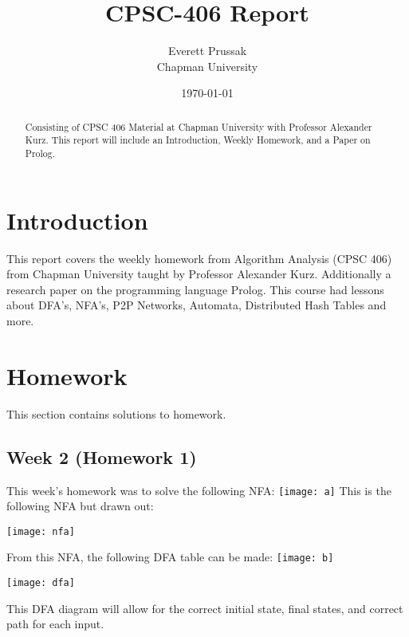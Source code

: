 \documentclass{article}
\title{CPSC-406 Report}
\author{Everett Prussak  \\ Chapman University}
\date{\today}
\theoremstyle{theorem}
\theoremstyle{definition}
\theoremstyle{remark}
\begin{document}
\maketitle

\begin{abstract}
Consisting of CPSC 406 Material at Chapman University with Professor Alexander Kurz. This report will include an Introduction, Weekly Homework, and a Paper on Prolog.
\end{abstract}

\tableofcontents

\section{Introduction}\label{intro}
This report covers the weekly homework from Algorithm Analysis (CPSC 406) from Chapman University taught by Professor Alexander Kurz. Additionally a research paper on the programming language Prolog. This course had lessons about DFA's, NFA's, P2P Networks, Automata, Distributed Hash Tables and more.

\section{Homework}\label{homework}

This section contains solutions to homework. 

\subsection{Week 2 (Homework 1)}
This week's homework was to solve the following NFA:\noindent\newline
\texttt{[image: a]}\noindent\newline
\noindent\newline This is the following NFA but drawn out:

\texttt{[image: nfa]}\noindent\newline

From this NFA, the following DFA table can be made:\noindent\newline
\texttt{[image: b]}\noindent\newline

\texttt{[image: dfa]}\noindent\newline

\noindent\newline\newline This DFA diagram will allow for the correct initial state, final states, and correct path for each input.
\end{document}
